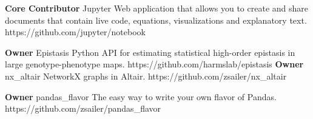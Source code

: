 \begin{cvossoftware}

  \cvoss
    {\textbf{Core Contributor} Jupyter} %
    {Web application that allows you to create and share documents that contain live code, equations, visualizations and explanatory text.} %
    {https://github.com/jupyter/notebook} %

  \cvoss
    {\textbf{Owner} Epistasis} %
    {Python API for estimating statistical high-order epistasis in large genotype-phenotype maps.}
    {https://github.com/harmslab/epistasis} %
  \cvoss
    {\textbf{Owner} nx\_altair} %
    {NetworkX graphs in Altair.}
    {https://github.com/zsailer/nx\_altair} %

  \cvoss
    {\textbf{Owner} pandas\_flavor} %
    {The easy way to write your own flavor of Pandas.}
    {https://github.com/zsailer/pandas\_flavor} %

\end{cvossoftware}
